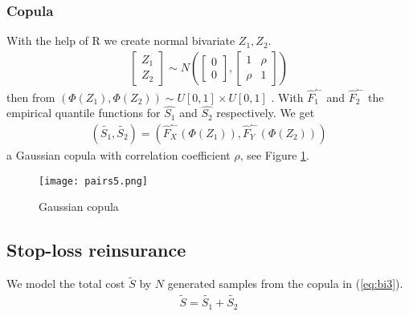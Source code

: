 \documentclass[11pt]{article}
\begin{document}
\subsubsection*{Copula}
With the help of R 
we create normal bivariate $Z_1,Z_2$.
\begin{align} \label{eq:bi1}
	 \begin{bmatrix} Z_1 \\ Z_2\end{bmatrix} \sim N\left(\begin{bmatrix} 0 \\ 0\end{bmatrix},\begin{bmatrix} 1&\rho \\ \rho&1\end{bmatrix}\right)
\end{align}
then from   $\left(\Phi(Z_1),\Phi(Z_2)\right) \sim  U[0,1] \times U[0,1]$ .
With $\hat{F}_1^\leftharpoonup$ and $\hat{F}_2^\leftharpoonup$ the empirical quantile functions for $\hat{S_1}$ and $\hat{S_2}$ respectively.
We get
\begin{align} \label{eq:bi3}
	  \left(\tilde{S_1},\tilde{S_2}\right) = \left(\hat{F}_X^\leftharpoonup(\Phi(Z_1)),\hat{F}_Y^\leftharpoonup(\Phi(Z_2))\right) 
\end{align}
a Gaussian copula with correlation coefficient $ \rho$, see Figure \ref{fig:copula}.

 \begin{figure}[h]
 \center
  \texttt{[image: pairs5.png]}
  \caption{Gaussian copula}
  \label{fig:copula}
\end{figure}



\subsection*{Stop-loss reinsurance}
We model the total cost $\tilde{S}$ by $N$ generated samples from the copula in (\ref{eq:bi3}).
\begin{align*} 
	\tilde{S}= \tilde{S_1} + \tilde{S_2}
\end{align*}
\end{document}

